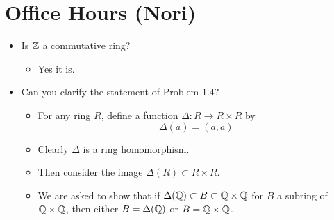 \documentclass[../notes.tex]{subfiles}
\begin{document}
\section{Office Hours (Nori)}
\begin{itemize}
    \item {}Is $\mathbb{Z}$ a commutative ring?
    \begin{itemize}
        \item Yes it is.
    \end{itemize}
    \item Can you clarify the statement of Problem 1.4?
    \begin{itemize}
        \item For any ring $R$, define a function $\Delta:R\to R\times R$ by
        \begin{equation*}
            \Delta(a) = (a,a)
        \end{equation*}
        \item Clearly $\Delta$ is a ring homomorphism.
        \item Then consider the image $\Delta(R)\subset R\times R$.
        \item We are asked to show that if $\Delta(\mathbb{Q})\subset B\subset\mathbb{Q}\times\mathbb{Q}$ for $B$ a subring of $\mathbb{Q}\times\mathbb{Q}$, then either $B=\Delta(\mathbb{Q})$ or $B=\mathbb{Q}\times\mathbb{Q}$.
    \end{itemize}
\end{itemize}
\end{document}
